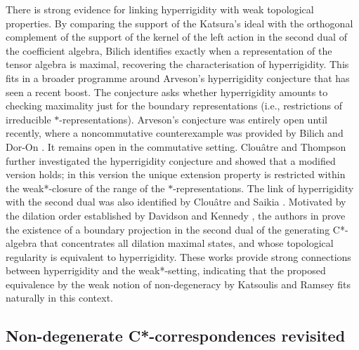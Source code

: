 \documentclass[11pt, draft]{amsart}
\numberwithin{equation}{section}
\theoremstyle{plain}
\theoremstyle{definition}
\theoremstyle{remark}
\begin{document}
There is strong evidence for linking hyperrigidity with weak topological properties.
By comparing the support of the Katsura's ideal with the orthogonal complement of the support of the kernel of the left action in the second dual of the coefficient algebra, Bilich \cite{Bil24} identifies exactly when a representation of the tensor algebra is maximal, recovering the characterisation of hyperrigidity.
This fits in a broader programme around Arveson's hyperrigidity conjecture that has seen a recent boost. 
The conjecture asks whether hyperrigidity amounts to checking maximality just for the boundary representations (i.e., restrictions of irreducible $*$-representations).
Arveson's conjecture was entirely open until recently, where a noncommutative counterexample was provided by Bilich and Dor-On \cite{BD24}.
It remains open in the commutative setting. 
Clou{\^a}tre and Thompson \cite{CT24} further investigated the hyperrigidity conjecture and showed that a modified version holds; in this version the unique extension property is restricted within the weak*-closure of the range of the $*$-representations.
The link of hyperrigidity with the second dual was also identified by Clou{\^a}tre and Saikia \cite{CS23}. 
Motivated by the dilation order established by Davidson and Kennedy \cite{DK24}, the authors in \cite{CS23} prove the existence of a boundary projection in the second dual of the generating C*-algebra that concentrates all dilation maximal states, and whose topological regularity is equivalent to hyperrigidity. 
These works provide strong connections between hyperrigidity and the weak*-setting, indicating that the proposed equivalence by the weak notion of non-degeneracy by Katsoulis and Ramsey \cite{KR20} fits naturally in this context.

\subsection{Non-degenerate C*-correspondences revisited}
\end{document}

